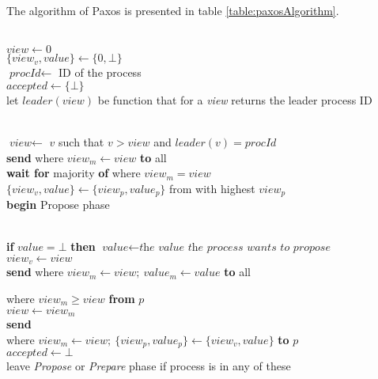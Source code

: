 The algorithm of Paxos is presented in table \ref{table:paxosAlgorithm}.
\begin{table}
\label{table:paxosAlgorithm}
\begin{description}
\small
 \item[Initialisation] \strut \\
   $\textit{view} \leftarrow 0$\\
   $\{\textit{view}_v, \textit{value}\} \leftarrow \{0, \bot\}$ \\
   $\textit{procId} \leftarrow $ ID of the process \\
   $\textit{accepted} \leftarrow \{ \bot \} $ \\
   let $leader(\textit{view})$ be function that for a \textit{view} returns the leader process ID


 \item[Prepare phase] \strut \\
   $\textit{view} \leftarrow $ $v$ such that $ v > \textit{view}$ and $leader(v) = \textit{procId}$\\
   \textbf{send}  where $\textit{view}_m \leftarrow \textit{view}$ \textbf{to} all\\
   \textbf{wait for} majority \textbf{of}  where $\textit{view}_m = \textit{view}$\\
   $\{\textit{view}_v, \textit{value}\} \leftarrow \{\textit{view}_p,\textit{value}_p\} $ from \prepareOK with highest $\textit{view}_p$\\
   \textbf{begin} Propose phase

 \item[Propose phase] \strut \\
   \textbf{if} $\textit{value} = \bot$ \textbf{then} $\textit{value} \leftarrow \textit{the value the process wants to propose}$\\
   $\textit{view}_v \leftarrow \textit{view}$ \\
   \textbf{send}  where $\textit{view}_m \leftarrow \textit{view};~\textit{value}_m \leftarrow \textit{value}$ \textbf{to} all

 \item[Upon]  where $\textit{view}_m \geq \textit{view}$ \textbf{from} $p$  \\
   $\textit{view} \leftarrow \textit{view}_m$ \\
   \textbf{send}  \\
       \hspace*{0.2\textwidth} where $\textit{view}_m \leftarrow \textit{view};~\{\textit{view}_p, \textit{value}_p\} \leftarrow \{\textit{view}_v, \textit{value}\}$ \textbf{to} $p$ \\
   $\textit{accepted} \leftarrow \bot $ \\
   leave \textsl{Propose} or \textsl{Prepare} phase if process is in any of these


\end{description}
\end{table}
